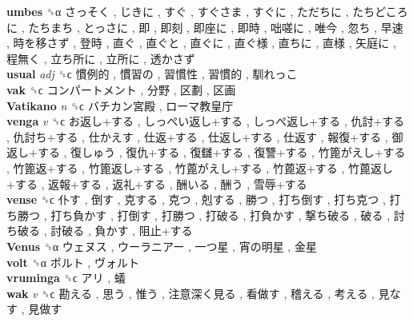 \textbf{umbes} ␝α   さっそく ,  じきに ,  すぐ ,  すぐさま ,  すぐに ,  ただちに ,  たちどころに ,  たちまち ,  とっさに ,  即 ,  即刻 ,  即座に ,  即時 ,  咄嗟に ,  唯今 ,  忽ち ,  早速 ,  時を移さず ,  登時 ,  直ぐ ,  直ぐと ,  直ぐに ,  直ぐ様 ,  直ちに ,  直様 ,  矢庭に ,  程無く ,  立ち所に ,  立所に ,  透かさず   \\
\textbf{usual} \emph{adj}  ␝ϲ   慣例的 ,  慣習の ,  習慣性 ,  習慣的 ,  馴れっこ   \\
\textbf{vak} ␝ϲ   コンパートメント ,  分野 ,  区劃 ,  区画   \\
\textbf{Vatikano} \emph{n}  ␝ϲ   バチカン宮殿 ,  ローマ教皇庁   \\
\textbf{venga} \emph{v}  ␝ϲ   お返し+する ,  しっぺい返し+する ,  しっぺ返し+する ,  仇討+する ,  仇討ち+する ,  仕かえす ,  仕返+する ,  仕返し+する ,  仕返す ,  報復+する ,  御返し+する ,  復しゅう ,  復仇+する ,  復讎+する ,  復讐+する ,  竹篦がえし+する ,  竹篦返+する ,  竹篦返し+する ,  竹蓖がえし+する ,  竹蓖返+する ,  竹蓖返し+する ,  返報+する ,  返礼+する ,  酬いる ,  酬う ,  雪辱+する   \\
\textbf{vense} ␝ϲ   仆す ,  倒す ,  克する ,  克つ ,  剋する ,  勝つ ,  打ち倒す ,  打ち克つ ,  打ち勝つ ,  打ち負かす ,  打倒す ,  打勝つ ,  打破る ,  打負かす ,  撃ち破る ,  破る ,  討ち破る ,  討破る ,  負かす ,  阻止+する   \\
\textbf{Venus} ␝α   ウェヌス ,  ウーラニアー ,  一つ星 ,  宵の明星 ,  金星   \\
\textbf{volt} ␝α   ボルト ,  ヴォルト   \\
\textbf{vruminga} ␝ϲ   アリ ,  蟻   \\
\textbf{wak} \emph{v}  ␝ϲ   勘える ,  思う ,  惟う ,  注意深く見る ,  看做す ,  稽える ,  考える ,  見なす ,  見做す   \\
